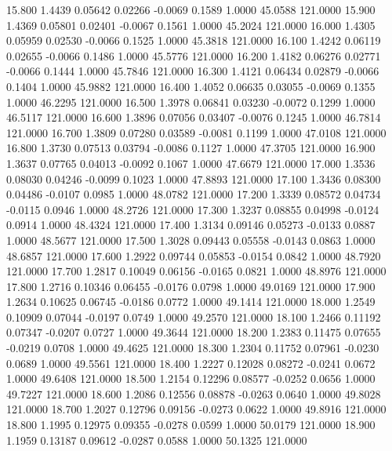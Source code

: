   15.800   1.4439   0.05642   0.02266  -0.0069   0.1589   1.0000  45.0588 121.0000
  15.900   1.4369   0.05801   0.02401  -0.0067   0.1561   1.0000  45.2024 121.0000
  16.000   1.4305   0.05959   0.02530  -0.0066   0.1525   1.0000  45.3818 121.0000
  16.100   1.4242   0.06119   0.02655  -0.0066   0.1486   1.0000  45.5776 121.0000
  16.200   1.4182   0.06276   0.02771  -0.0066   0.1444   1.0000  45.7846 121.0000
  16.300   1.4121   0.06434   0.02879  -0.0066   0.1404   1.0000  45.9882 121.0000
  16.400   1.4052   0.06635   0.03055  -0.0069   0.1355   1.0000  46.2295 121.0000
  16.500   1.3978   0.06841   0.03230  -0.0072   0.1299   1.0000  46.5117 121.0000
  16.600   1.3896   0.07056   0.03407  -0.0076   0.1245   1.0000  46.7814 121.0000
  16.700   1.3809   0.07280   0.03589  -0.0081   0.1199   1.0000  47.0108 121.0000
  16.800   1.3730   0.07513   0.03794  -0.0086   0.1127   1.0000  47.3705 121.0000
  16.900   1.3637   0.07765   0.04013  -0.0092   0.1067   1.0000  47.6679 121.0000
  17.000   1.3536   0.08030   0.04246  -0.0099   0.1023   1.0000  47.8893 121.0000
  17.100   1.3436   0.08300   0.04486  -0.0107   0.0985   1.0000  48.0782 121.0000
  17.200   1.3339   0.08572   0.04734  -0.0115   0.0946   1.0000  48.2726 121.0000
  17.300   1.3237   0.08855   0.04998  -0.0124   0.0914   1.0000  48.4324 121.0000
  17.400   1.3134   0.09146   0.05273  -0.0133   0.0887   1.0000  48.5677 121.0000
  17.500   1.3028   0.09443   0.05558  -0.0143   0.0863   1.0000  48.6857 121.0000
  17.600   1.2922   0.09744   0.05853  -0.0154   0.0842   1.0000  48.7920 121.0000
  17.700   1.2817   0.10049   0.06156  -0.0165   0.0821   1.0000  48.8976 121.0000
  17.800   1.2716   0.10346   0.06455  -0.0176   0.0798   1.0000  49.0169 121.0000
  17.900   1.2634   0.10625   0.06745  -0.0186   0.0772   1.0000  49.1414 121.0000
  18.000   1.2549   0.10909   0.07044  -0.0197   0.0749   1.0000  49.2570 121.0000
  18.100   1.2466   0.11192   0.07347  -0.0207   0.0727   1.0000  49.3644 121.0000
  18.200   1.2383   0.11475   0.07655  -0.0219   0.0708   1.0000  49.4625 121.0000
  18.300   1.2304   0.11752   0.07961  -0.0230   0.0689   1.0000  49.5561 121.0000
  18.400   1.2227   0.12028   0.08272  -0.0241   0.0672   1.0000  49.6408 121.0000
  18.500   1.2154   0.12296   0.08577  -0.0252   0.0656   1.0000  49.7227 121.0000
  18.600   1.2086   0.12556   0.08878  -0.0263   0.0640   1.0000  49.8028 121.0000
  18.700   1.2027   0.12796   0.09156  -0.0273   0.0622   1.0000  49.8916 121.0000
  18.800   1.1995   0.12975   0.09355  -0.0278   0.0599   1.0000  50.0179 121.0000
  18.900   1.1959   0.13187   0.09612  -0.0287   0.0588   1.0000  50.1325 121.0000
